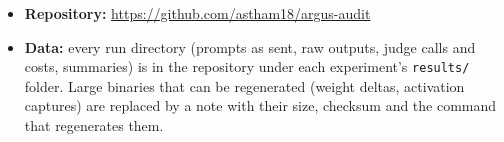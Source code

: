 
\begin{itemize}\sloppy
  \item \textbf{Repository:} \url{https://github.com/astham18/argus-audit}

  \item \textbf{Data:} every run directory (prompts as sent, raw outputs, judge calls and costs,
  summaries) is in the repository under each experiment's \texttt{results/} folder.
  Large binaries that can be regenerated (weight deltas, activation captures) are replaced by a note
  with their size, checksum and the command that regenerates them.
\end{itemize}
